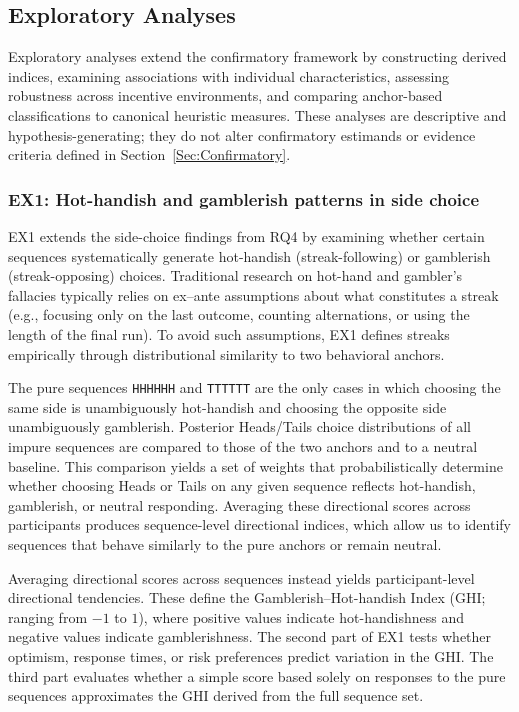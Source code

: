 \documentclass[11pt,a4paper]{article}
\numberwithin{equation}{section}
\begin{document}
	
\vspace{1em}
\subsection{Exploratory Analyses}
\label{Sec:Exploratory}

Exploratory analyses extend the confirmatory framework by constructing derived indices, examining associations with individual characteristics, assessing robustness across incentive environments, and comparing anchor-based classifications to canonical heuristic measures. These analyses are descriptive and hypothesis-generating; they do not alter confirmatory estimands or evidence criteria defined in Section~\ref{Sec:Confirmatory}.

\subsubsection{EX1: Hot-handish and gamblerish patterns in side choice}
\label{Sec:Ex1}

EX1 extends the side-choice findings from RQ4 by examining whether certain
sequences systematically generate hot-handish (streak-following) or
gamblerish (streak-opposing) choices.
Traditional research on hot-hand and
gambler’s fallacies typically relies on ex--ante assumptions about what
constitutes a streak (e.g., focusing only on the last outcome, counting
alternations, or using the length of the final run). To avoid such assumptions,
EX1 defines streaks empirically through distributional similarity to two
behavioral anchors.

The pure sequences \texttt{HHHHHH} and \texttt{TTTTTT} are the only cases in
which choosing the same side is unambiguously hot-handish and choosing the
opposite side unambiguously gamblerish. Posterior Heads/Tails choice
distributions of all impure sequences are compared to those of the two anchors
and to a neutral baseline. This comparison yields a set of weights that
probabilistically determine whether choosing Heads or Tails on any given
sequence reflects hot-handish, gamblerish, or neutral responding. Averaging
these directional scores across participants produces sequence-level directional
indices, which allow us to identify sequences that behave similarly to the pure
anchors or remain neutral.

Averaging directional scores across sequences instead yields participant-level
directional tendencies. These define the Gamblerish--Hot-handish Index (GHI;
ranging from $-1$ to $1$), where positive values indicate
hot-handishness and negative values indicate gamblerishness. The second part of
EX1 tests whether optimism, response times, or risk preferences predict
variation in the GHI. The third part evaluates whether a simple score based
solely on responses to the pure sequences approximates the GHI derived from the
full sequence set.
\end{document}
